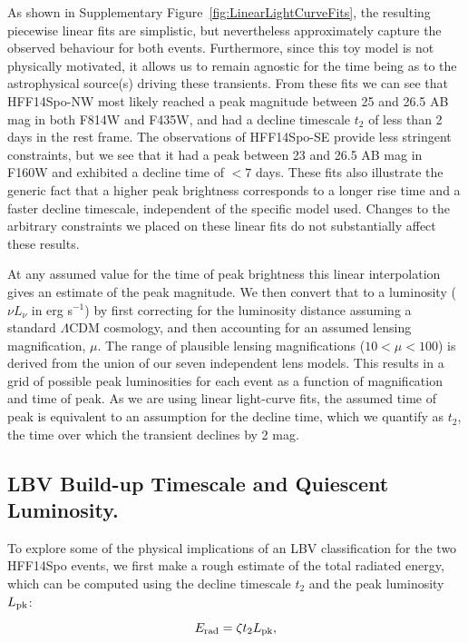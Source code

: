 \documentclass{article}
\def\LCDM{$\Lambda$CDM\xspace}
\def\spock{HFF14Spo\xspace}
\def\spockone{HFF14Spo-NW\xspace}
\def\spocktwo{HFF14Spo-SE\xspace}
\def\Lpk{\ensuremath{L_{\rm pk}}\xspace}
\def\t2{\ensuremath{t_{2}}\xspace}
\begin{document}
As shown in Supplementary Figure~\ref{fig:LinearLightCurveFits}, the resulting
piecewise linear fits are simplistic, but nevertheless approximately
capture the observed behaviour for both events.  Furthermore, since
this toy model is not physically motivated, it allows us to remain
agnostic for the time being as to the astrophysical source(s) driving
these transients.  From these fits we can see that \spockone most
likely reached a peak magnitude between 25 and 26.5 AB mag in both
F814W and F435W, and had a decline timescale $t_2$ of less than 2 days
in the rest frame. The observations of \spocktwo provide less
stringent constraints, but we see that it had a peak between
23 and 26.5 AB mag in F160W and exhibited a decline time of $<7$
days.  These fits also illustrate the generic fact that a higher
peak brightness corresponds to a longer rise time and a faster decline
timescale, independent of the specific model used.  Changes to the
arbitrary constraints we placed on these linear fits do not
substantially affect these results.

At any assumed value for the time of peak brightness this linear
interpolation gives an estimate of the peak magnitude. We then convert
that to a luminosity ($\nu L_\nu$ in erg s$^{-1}$) by first
correcting for the luminosity distance assuming a standard \LCDM
cosmology, and then accounting for an assumed lensing magnification,
$\mu$.  The range of plausible lensing magnifications ($10<\mu<100$)
is derived from the union of our seven independent lens models.  This
results in a grid of possible peak luminosities for each event as a
function of magnification and time of peak.  As we are using linear
light-curve fits, the assumed time of peak is equivalent to an
assumption for the decline time, which we quantify as $t_2$, the time
over which the transient declines by 2 mag.


\subsection{LBV Build-up Timescale and Quiescent Luminosity.}\label{sec:LBVbuildup}

To explore some of the physical implications of an LBV classification
for the two \spock events, we first make a rough estimate of the total
radiated energy, which can be computed using the decline timescale
$t_2$ and the peak luminosity $L_{\rm pk}$:

\begin{equation}
  \label{eqn:Erad}
  E_{\rm rad} = \zeta \t2 \Lpk,
\end{equation}
\end{document}
